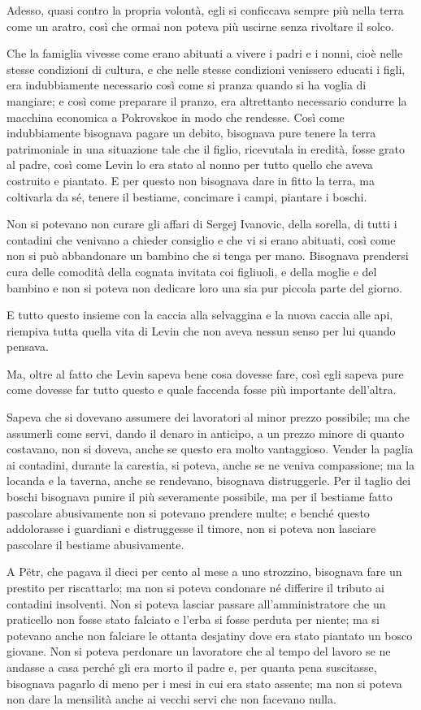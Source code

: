 Adesso, quasi contro la propria volontà, egli si conficcava sempre più nella terra come un aratro, così che ormai non poteva più uscirne senza rivoltare il solco. 

Che la famiglia vivesse come erano abituati a vivere i padri e i nonni, cioè nelle stesse condizioni di cultura, e che nelle stesse condizioni venissero educati i figli, era indubbiamente necessario così come si pranza quando si ha voglia di mangiare; e così come preparare il pranzo, era altrettanto necessario condurre la macchina economica a Pokrovskoe in modo che rendesse. Così come indubbiamente bisognava pagare un debito, bisognava pure tenere la terra patrimoniale in una situazione tale che il figlio, ricevutala in eredità, fosse grato al padre, così come Levin lo era stato al nonno per tutto quello che aveva costruito e piantato. E per questo non bisognava dare in fitto la terra, ma coltivarla da sé, tenere il bestiame, concimare i campi, piantare i boschi. 

Non si potevano non curare gli affari di Sergej Ivanovic, della sorella, di tutti i contadini che venivano a chieder consiglio e che vi si erano abituati, così come non si può abbandonare un bambino che si tenga per mano. Bisognava prendersi cura delle comodità della cognata invitata coi figliuoli, e della moglie e del bambino e non si poteva non dedicare loro una sia pur piccola parte del giorno. 

E tutto questo insieme con la caccia alla selvaggina e la nuova caccia alle api, riempiva tutta quella vita di Levin che non aveva nessun senso per lui quando pensava. 

Ma, oltre al fatto che Levin sapeva bene cosa dovesse fare, così egli sapeva pure come dovesse far tutto questo e quale faccenda fosse più importante dell'altra. 

Sapeva che si dovevano assumere dei lavoratori al minor prezzo possibile; ma che assumerli come servi, dando il denaro in anticipo, a un prezzo minore di quanto costavano, non si doveva, anche se questo era molto vantaggioso. Vender la paglia ai contadini, durante la carestia, si poteva, anche se ne veniva compassione; ma la locanda e la taverna, anche se rendevano, bisognava distruggerle. Per il taglio dei boschi bisognava punire il più severamente possibile, ma per il bestiame fatto pascolare abusivamente non si potevano prendere multe; e benché questo addolorasse i guardiani e distruggesse il timore, non si poteva non lasciare pascolare il bestiame abusivamente. 

A Pëtr, che pagava il dieci per cento al mese a uno strozzino, bisognava fare un prestito per riscattarlo; ma non si poteva condonare né differire il tributo ai contadini insolventi. Non si poteva lasciar passare all'amministratore che un praticello non fosse stato falciato e l'erba si fosse perduta per niente; ma si potevano anche non falciare le ottanta desjatiny dove era stato piantato un bosco giovane. Non si poteva perdonare un lavoratore che al tempo del lavoro se ne andasse a casa perché gli era morto il padre e, per quanta pena suscitasse, bisognava pagarlo di meno per i mesi in cui era stato assente; ma non si poteva non dare la mensilità anche ai vecchi servi che non facevano nulla. 

